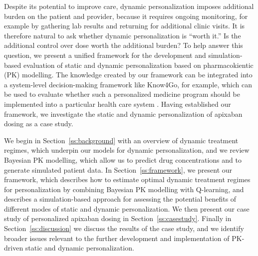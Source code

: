 Despite its potential to improve care, dynamic personalization imposes additional burden on the patient and provider, because it requires ongoing monitoring, for example by gathering lab results and returning for additional clinic visits. It is therefore natural to ask whether dynamic personalization is ``worth it.'' Is the additional control over dose worth the additional burden? To help answer this question, we present a unified framework for the development and simulation-based evaluation of static and dynamic personalization based on pharmacokientic (PK) modelling. The knowledge created by our framework can be integrated into a system-level decision-making framework like Know4Go, for example, which can be used to evaluate whether such a personalized medicine program should be implemented into a particular health care system \cite{Martin2016}. Having established our framework, we investigate the static and dynamic personalization of apixaban dosing as a case study.

We begin in Section~\ref{ss:background} with an overview of dynamic treatment regimes, which underpin our models for dynamic personalization, and we review Bayesian PK modelling, which allow us to predict drug concentrations and to generate simulated patient data. In Section~\ref{ss:framework}, we present our framework, which describes how to estimate  optimal dynamic treatment regimes for personalization by combining Bayesian PK modelling with Q-learning, and describes a simulation-based approach for assessing the potential benefits of different modes of static and dynamic personalization.  We then present our case study of personalized apixaban dosing in Section~\ref{ss:casestudy}. Finally in Section~\ref{ss:discussion} we discuss the results of the case study, and we identify broader issues relevant to the further development and implementation of PK-driven static and dynamic personalization.
